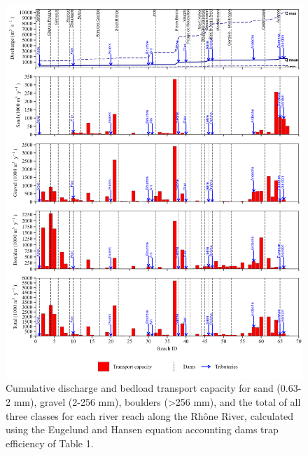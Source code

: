 \documentclass[
]{book}
\begin{document}
\begin{figure}
\includegraphics[width=26.24in]{img/res_cascade/res_E2_eE&H/plots_tr_cap-silt/tr_cap_res_sum_hy_E2_eE&H} \caption{Cumulative discharge and bedload transport capacity for sand (0.63-2 mm), gravel (2-256 mm), boulders (>256 mm), and the total of all three classes for each river reach along the Rhône River, calculated using the Eugelund and Hansen equation accounting dams trap efficiency of Table 1.}\label{fig:TrcE2eE}
\end{figure}
\end{document}
